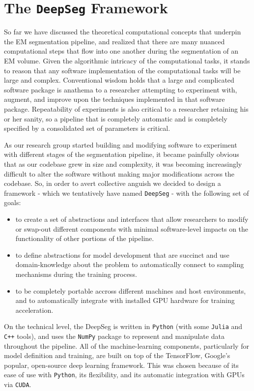 \chapter{The \texttt{DeepSeg} Framework}
So far we have discussed the theoretical computational concepts that underpin the EM segmentation pipeline, and realized that there are many nuanced computational steps that flow into one another during the segmentation of an EM volume. Given the algorithmic intricacy of the computational tasks, it stands to reason that any software implementation of the computational tasks will be large and complex. Conventional wisdom holds that a large and complicated software package is anathema to a researcher attempting to experiment with, augment, and improve upon the techniques implemented in that software package. Repeatability of experiments is also critical to a researcher retaining his or her sanity, so a pipeline that is completely automatic and is completely specified by a consolidated set of parameters is critical.

As our research group started building and modifying software to experiment with different stages of the segmentation pipeline, it became painfully obvious that as our codebase grew in size and complexity, it was becoming increasingly difficult to alter the software without making major modifications across the codebase. So, in order to avert collective anguish we decided to design a framework - which we tentatively have named \texttt{DeepSeg} - with the following set of goals:

\begin{itemize}
	\item to create a set of abstractions and interfaces that allow researchers to modify or swap-out different components with minimal software-level impacts on the functionality of other portions of the pipeline.
	\item to define abstractions for model development that are succinct and use domain-knowledge about the problem to automatically connect to sampling mechanisms during the training process. 
	\item to be completely portable accross different machines and host environments, and to automatically integrate with installed GPU hardware for training acceleration.
\end{itemize}

On the technical level, the DeepSeg is written in \texttt{Python} (with some \texttt{Julia} and \texttt{C++} tools), and uses the \texttt{NumPy} package to represent and manipulate data throughout the pipeline. All of the machine-learning components, particularly for model definition and training, are built on top of the TensorFlow, Google's popular, open-source deep learning framework. This was chosen because of its ease of use with \texttt{Python}, its flexibility, and its automatic integration with GPUs via \texttt{CUDA}.

